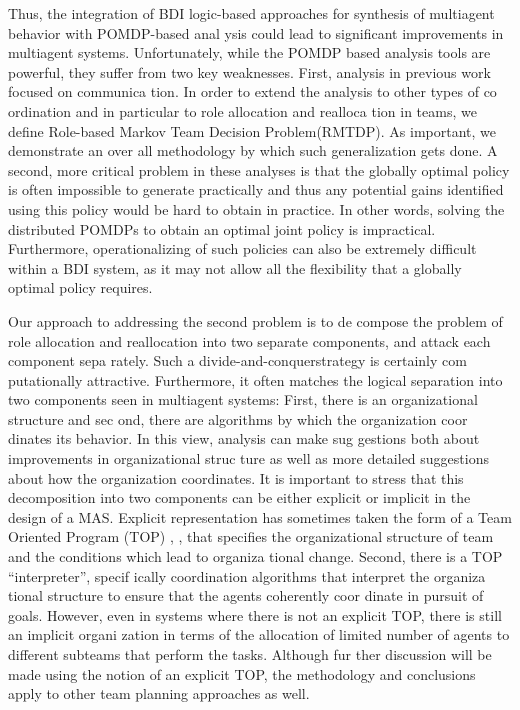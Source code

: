 \documentclass{IEEEtran}
\begin{document}
  Thus, the integration of BDI logic-based approaches for
 synthesis of multiagent behavior with POMDP-based anal
ysis could lead to significant improvements in multiagent
 systems. Unfortunately, while the POMDP based analysis
 tools are powerful, they suffer from two key weaknesses.
 First, analysis in previous work focused on communica
tion. In order to extend the analysis to other types of co
ordination and in particular to role allocation and realloca
tion in teams, we define Role-based Markov Team Decision 
 Problem(RMTDP). As important, we demonstrate an over
all methodology by which such generalization gets done.
 A second, more critical problem in these analyses is that
 the globally optimal policy is often impossible to generate
 practically and thus any potential gains identified using this
 policy would be hard to obtain in practice. In other words,
 solving the distributed POMDPs to obtain an optimal joint
 policy is impractical. Furthermore, operationalizing of such
 policies can also be extremely difficult within a BDI system,
 as it may not allow all the flexibility that a globally optimal
 policy requires.

  Our approach to addressing the second problem is to de
compose the problem of role allocation and reallocation into
 two separate components, and attack each component sepa
rately. Such a divide-and-conquerstrategy is certainly com
putationally attractive. Furthermore, it often matches the
 logical separation into two components seen in multiagent
 systems: First, there is an organizational structure and sec
ond, there are algorithms by which the organization coor
dinates its behavior. In this view, analysis can make sug
gestions both about improvements in organizational struc
ture as well as more detailed suggestions about how the
 organization coordinates. It is important to stress that this
 decomposition into two components can be either explicit
 or implicit in the design of a MAS. Explicit representation
 has sometimes taken the form of a Team Oriented Program
 (TOP) \cite{tambe2000building}, \cite{tidhar1993team}, \cite{Tavares} that specifies the organizational
 structure of team and the conditions which lead to organiza
tional change. Second, there is a TOP “interpreter”, specif
ically coordination algorithms that interpret the organiza
tional structure to ensure that the agents coherently coor
dinate in pursuit of goals. However, even in systems where
 there is not an explicit TOP, there is still an implicit organi
zation in terms of the allocation of limited number of agents
 to different subteams that perform the tasks. Although fur
ther discussion will be made using the notion of an explicit
 TOP, the methodology and conclusions apply to other team
 planning approaches as well.
\end{document}
